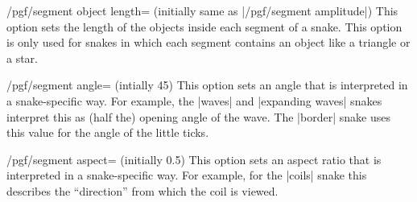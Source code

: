 \begin{key}{/pgf/segment object length= (initially
    \normalfont same as |/pgf/segment amplitude|)}
  This option sets the length of the objects inside each segment of a
  snake. This option is only used for snakes in which each segment
  contains an object like a triangle or a star. 
\begin{codeexample}[]
\end{codeexample}
\end{key}

\begin{key}{/pgf/segment angle= (intially 45)}
  This option sets an angle that is interpreted in a snake-specific
  way. For example, the |waves| and |expanding waves| snakes interpret
  this as (half the) opening angle of the wave. The |border| snake
  uses this value for the angle of the little ticks.
\begin{codeexample}[]
\end{codeexample}
\begin{codeexample}[]
\end{codeexample}
\end{key}

\begin{key}{/pgf/segment aspect= (initially 0.5)}
  This option sets an aspect ratio that is interpreted in a
  snake-specific way. For example, for the |coils| snake this
  describes the ``direction'' from which the coil is viewed.
\begin{codeexample}[]
\end{codeexample}
\end{key}

